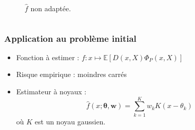 \documentclass[c]{beamer}
\begin{document}
\begin{frame}
\begin{columns}
\begin{column}{.5\textwidth}
\begin{figure}
        \caption{$\hat{f}$ non adapt\'ee.}
      \end{figure}
    \end{column}
  \end{columns}
\end{frame}

\begin{frame}
  \frametitle{Application au problème initial}

  \begin{itemize}
    \item Fonction à estimer : $f : x \mapsto \mathbb{E}\left[ D(x,X) \Phi_P(x,X) \right]$
    \item Risque empirique : moindres carr\'es
    \item Estimateur à noyaux :
      \[
        \hat{f}(x; \mathbf{\theta}, \mathbf{w}) = \sum_{k = 1}^K w_k K(x - \theta_k)
      \]
      où $K$ est un noyau gaussien.
  \end{itemize}
\end{frame}
\end{document}
